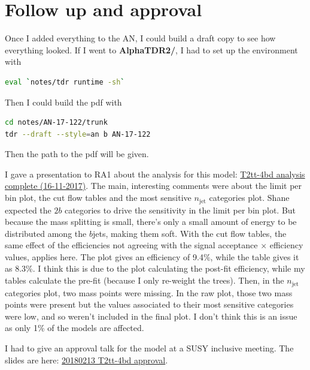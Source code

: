 

\section{Follow up and approval}

Once I added everything to the AN, I could build a draft copy to see how everything looked. If I went to \textbf{AlphaTDR2/}, I had to set up the environment with

\begin{lstlisting}[belowskip=-0.7cm, language=sh, numbers=none]
eval `notes/tdr runtime -sh`
\end{lstlisting}

Then I could build the pdf with

\begin{lstlisting}[belowskip=-0.7cm, language=sh, numbers=none]
cd notes/AN-17-122/trunk
tdr --draft --style=an b AN-17-122
\end{lstlisting}

Then the path to the pdf will be given.

I gave a presentation to RA1 about the analysis for this model: \href{run:./sec31/T2tt-4bd analysis complete (16-11-2017).pdf}{T2tt-4bd analysis complete (16-11-2017)}. The main, interesting comments were about the limit per bin plot, the cut flow tables and the most sensitive $n_{\mathrm{jet}}$ categories plot. Shane expected the $2b$ categories to drive the sensitivity in the limit per bin plot. But because the mass splitting is small, there's only a small amount of energy to be distributed among the $b$jets, making them soft. With the cut flow tables, the same effect of the efficiencies not agreeing with the signal acceptance $\times$ efficiency values, applies here. The plot gives an efficiency of 9.4\%, while the table gives it as 8.3\%. I think this is due to the plot calculating the post-fit efficiency, while my tables calculate the pre-fit (because I only re-weight the trees). Then, in the $n_{\mathrm{jet}}$ categories plot, two mass points were missing. In the raw plot, those two mass points were present but the values associated to their most sensitive categories were low, and so weren't included in the final plot. I don't think this is an issue as only 1\% of the models are affected.

I had to give an approval talk for the model at a SUSY inclusive meeting. The slides are here: \href{run:./sec31/T20180213 T2tt-4bd approval.pdf}{20180213 T2tt-4bd approval}.


